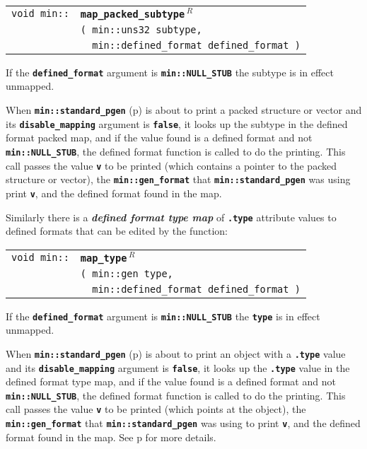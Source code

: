 \documentclass[12pt]{article}
\makeatletter
\newcommand{\TT}[1]{{\tt \bfseries #1}}
\newcommand{\key}[1]{{\bf \em #1}\index{#1}}
\newcommand{\ttindex}[1]{\index{#1@{\tt #1}}}
\newcommand{\pagref}[1]{p\pageref{#1}}
\newcommand{\EOL}{\penalty \exhyphenpenalty}
\newenvironment{indpar}[1][0.3in]%
	{\begin{list}{}%
		     {\setlength{\itemsep}{0in}%
		      \setlength{\topsep}{0in}%
		      \setlength{\parsep}{1ex}%
		      \setlength{\labelwidth}{#1}%
		      \setlength{\leftmargin}{#1}%
		      \addtolength{\leftmargin}{\labelsep}}%
	 \item}%
	{\end{list}}
\newcommand{\LABEL}[1]{\label{#1}}
\newlength{\ARGBREAKLENGTH}
\newcommand{\ARGBREAK}[1][\ARGBREAKLENGTH]{\\&\hspace*{#1}}
\newcommand{\MINKEY}[1]%
	   {\TT{#1}\ttindex{min::#1}\ttindex{#1}}
\newcommand{\REL}{$\,^R$}
\makeatother
\begin{document}
\begin{indpar}\begin{tabular}{r@{}l}
\verb|void min::| & \MINKEY{map\_packed\_subtype\REL}\ARGBREAK
    \verb|( min::uns32 subtype,|\ARGBREAK
    \verb|  min::defined_format defined_format )|
\LABEL{MIN::MAP_PACKED_SUBTYPE_TO_DEFINED_FORMAT} \\
\end{tabular}\end{indpar}

If the \TT{defined\_format} argument is \TT{min::\EOL NULL\_\EOL STUB}
the subtype is in effect unmapped.

When \TT{min::standard\_pgen} (\pagref{MIN::STANDARD_PGEN}) is
about to print a packed structure or vector and its
\TT{disable\_\EOL mapping} argument is \TT{false}, it looks up the subtype in
the defined format packed map, and if the value found is a
defined format and not \TT{min::\EOL NULL\_\EOL STUB}, the defined
format function is called to do the printing.  This call passes
the value \TT{v} to be printed (which contains a pointer to the
packed structure or vector), the \TT{min::\EOL gen\_\EOL format}
that \TT{min::\EOL standard\_\EOL pgen} was using print \TT{v},
and the defined format found in the map.

Similarly there is a \key{defined format type map}%
\label{DEFINED-FORMAT-TYPE-MAP} of \TT{.type}
attribute values to defined formats that can be edited by the function:

\begin{indpar}\begin{tabular}{r@{}l}
\verb|void min::| & \MINKEY{map\_type\REL}\ARGBREAK
    \verb|( min::gen type,|\ARGBREAK
    \verb|  min::defined_format defined_format )|
\LABEL{MIN::MAP_TYPE_TO_DEFINED_FORMAT} \\
\end{tabular}\end{indpar}

If the \TT{defined\_format} argument is \TT{min::\EOL NULL\_\EOL STUB}
the \TT{type} is in effect unmapped.

When \TT{min::standard\_pgen} (\pagref{MIN::STANDARD_PGEN}) is
about to print an object with a \TT{.type} value and its
\TT{disable\_\EOL mapping} argument is \TT{false}, it looks up
the \TT{.type} value in
the defined format type map, and if the value found is a
defined format and not \TT{min::\EOL NULL\_\EOL STUB}, the defined
format function is called to do the printing.  This call passes
the value \TT{v} to be printed (which points at the object),
the \TT{min::\EOL gen\_\EOL format}
that \TT{min::\EOL standard\_\EOL pgen} was using to print \TT{v},
and the defined format found in the map.
See \pagref{DEFINED-FORMAT-TYPE-TRANSLATION} for more details.
\end{document}

